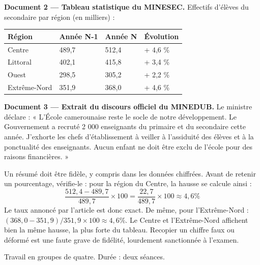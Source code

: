 \documentclass[11pt]{article}
\newcommand{\cle}[1]{{\popxbold\color{popdark}#1}}
\newcounter{popsec}
\newcounter{popsub}
\newcommand{\courssub}[1]{%
  \stepcounter{popsub}%
  \par\vspace{9pt}\noindent{\popxbold\fontsize{11.5}{13}\selectfont\color{popink}{\color{poporange}\thepopsec.\thepopsub}\hspace{6pt}#1}\par\nopagebreak\vspace{4pt}
}
\begin{document}
\textbf{Document 2 — Tableau statistique du MINESEC.} Effectifs d'élèves du secondaire par région (en milliers) :

\begin{center}
\begin{tabularx}{\linewidth}{|l|X|X|X|}\hline
\rowcolor{popblueL} \textbf{Région} & \textbf{Année N-1} & \textbf{Année N} & \textbf{Évolution} \\ \hline
Centre & 489,7 & 512,4 & + 4,6 \% \\ \hline
Littoral & 402,1 & 415,8 & + 3,4 \% \\ \hline
Ouest & 298,5 & 305,2 & + 2,2 \% \\ \hline
Extrême-Nord & 351,9 & 368,0 & + 4,6 \% \\ \hline
\end{tabularx}
\end{center}

\textbf{Document 3 — Extrait du discours officiel du MINEDUB.} Le ministre déclare : « L'École camerounaise reste le socle de notre développement. Le Gouvernement a recruté 2 000 enseignants du primaire et du secondaire cette année. J'exhorte les chefs d'établissement à veiller à l'assiduité des élèves et à la ponctualité des enseignants. Aucun enfant ne doit être exclu de l'école pour des raisons financières. »

\begin{attention}
Un résumé doit être \cle{fidèle}, y compris dans les données chiffrées. Avant de retenir un pourcentage, vérifie-le : pour la région du Centre, la hausse se calcule ainsi :
\[ \frac{512,4 - 489,7}{489,7} \times 100 = \frac{22,7}{489,7} \times 100 \approx 4,6 \% \]
Le taux annoncé par l'article est donc exact. De même, pour l'Extrême-Nord : $(368,0 - 351,9) / 351,9 \times 100 \approx 4,6 \%$. Le Centre et l'Extrême-Nord affichent bien la même hausse, la plus forte du tableau. Recopier un chiffre faux ou déformé est une faute grave de fidélité, lourdement sanctionnée à l'examen.
\end{attention}

\courssub{Consignes}

Travail en groupes de quatre. Durée : deux séances.
\end{document}
